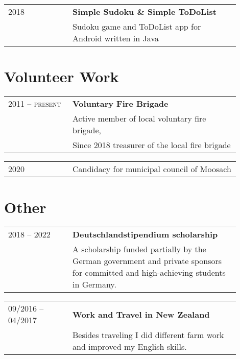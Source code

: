 \documentclass[a4paper, 10pt]{article}
\newenvironment{cventry}[2]
{   
    \setlength{\tabcolsep}{1.25em}
    \hypersetup{urlcolor=black}
    \begin{center}\hspace{-1.25cm}\begin{tabular}{p{0.25\linewidth}|p{0.65\linewidth}}
    \raggedleft\scshape #1 & \bfseries#2 \vspace{0.1cm}\\ & 
}
{\end{tabular}\end{center}}
\newenvironment{cventrynoheading}[1]
{
    \setlength{\tabcolsep}{1.25em}
    \begin{center}\hspace{-1.25cm}\begin{tabular}{p{0.25\linewidth}|p{0.65\linewidth}}
    \raggedleft\scshape #1 & 
}
{\end{tabular}\end{center}}
\newcommand{\newentryline}{\\&}
\begin{document}
\begin{cventry}{2018}
    {Simple Sudoku \href{https://github.com/korbi98/Simple-Sudoku}{\normalfont\faGithub} 
    \& Simple ToDoList \href{https://github.com/korbi98/Simple-ToDoList}{\normalfont\faGithub}}
    Sudoku game and ToDoList app for Android written in Java
\end{cventry}

\section{Volunteer Work}

\begin{cventry}{2011 -- present}{Voluntary Fire Brigade}
    Active member of local voluntary fire brigade, \newentryline 
    Since 2018 treasurer of the local fire brigade
\end{cventry}

\begin{cventrynoheading}{2020}
    Candidacy for municipal council of Moosach
\end{cventrynoheading}


\section{Other}

\begin{cventry}{2018 -- 2022} {Deutschlandstipendium scholarship}
    A scholarship funded partially by the German government and private sponsors for 
    committed and high-achieving students in Germany.
\end{cventry}

\begin{cventry}{09/2016 -- 04/2017}{Work and Travel in New Zealand}
    Besides traveling I did different farm work and improved my English skills.
\end{cventry}
\end{document}
